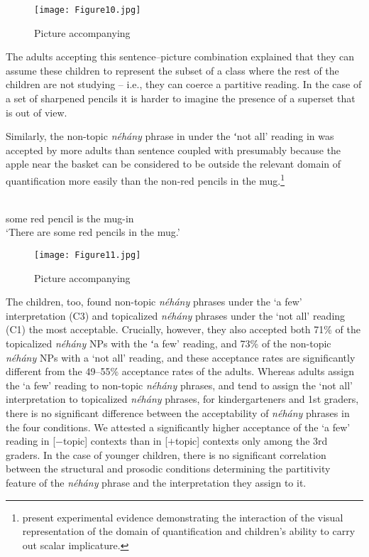 \documentclass[output=paper]{langscibook}
\begin{document}
\begin{figure}
    \centering
    \texttt{[image: Figure10.jpg]}
    \caption{Picture accompanying }
    \label{kis-zet:children reading}
\end{figure}

The adults accepting this sentence–picture combination explained that they can assume these children to represent the subset of a class where the rest of the children are not studying – i.e., they can coerce a partitive reading. In the case of a set of sharpened pencils it is harder to imagine the presence of a superset that is out of view.\largerpage

Similarly, the non-topic \textit{néhány} phrase in  under the ʻnot all’ reading in  was accepted by more adults than sentence  coupled with  presumably because the apple near the basket can be considered to be outside the relevant domain of quantification more easily than the non-red pencils in the mug.\footnote{\citet{ekisszt18} present experimental evidence demonstrating the interaction of the visual representation of the domain of quantification and children’s ability to carry out scalar implicature.} 

\ea\label{kis-zet:piros ceruza}
\\  
    {} some red pencil is the mug-in \\ 
\glt ‘There are some red pencils in the mug.’
\z


\begin{figure}
    \centering
    \texttt{[image: Figure11.jpg]}
    \caption{Picture accompanying }
    \label{kis-zet:pencils}
\end{figure}

The children, too, found non-topic \textit{néhány} phrases under the `a few' interpretation (C3) and topicalized \textit{néhány} phrases under the `not all' reading (C1) the most acceptable. Crucially, however, they also accepted both 71\% of the topicalized \textit{néhány} NPs with the ʻa few’ reading, and 73\% of the non-topic \textit{néhány} NPs with a `not all' reading, and these acceptance rates are significantly different from the 49--55\% acceptance rates of the adults. Whereas adults assign the `a few' reading to non-topic \textit{néhány} phrases,
and tend to assign the `not all' interpretation to topicalized \textit{néhány}
phrases, for kindergarteners and 1st graders, there is no significant difference between the acceptability of \textit{néhány} phrases in the four conditions. We attested a significantly higher acceptance of the `a few' reading in [$-$topic] contexts than in [$+$topic] contexts only among the 3rd graders. In the case of younger children, there is no significant correlation between the structural and prosodic conditions determining the partitivity feature of the \textit{néhány} phrase and the interpretation they assign to it. 
\end{document}
